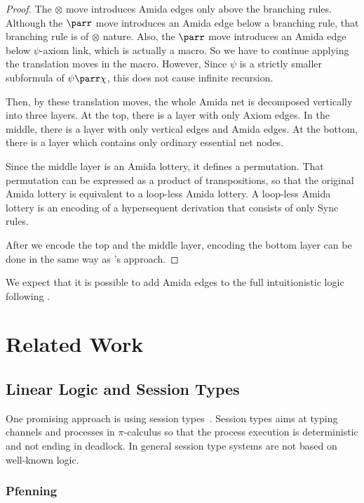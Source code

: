 \begin{proof}
The $\otimes$ move introduces Amida edges only above the branching rules.
Although the $\parr$ move introduces an Amida edge below a
branching rule, that branching rule is of $\otimes$ nature.
Also, the $\parr$ move introduces an Amida edge below $\psi$-axiom link,
which is actually a macro.  So we have to continue applying the
translation moves in the macro.  However, Since $\psi$ is a strictly
smaller subformula of $\psi\parr\chi$, this does not cause infinite
recursion.

Then, by these translation moves,
the whole Amida net is decomposed vertically into three layers.
At the top, there is a layer with only Axiom edges.
In the middle, there is a layer with only vertical edges and Amida
edges.
At the bottom, there is a layer which contains only ordinary
essential net nodes.

Since the middle layer is an Amida lottery, it defines a permutation.
That permutation can be expressed as a product of transpositions, so
that
the original Amida lottery is equivalent to a loop-less Amida lottery.
A loop-less Amida lottery is an encoding of a hypersequent derivation
that consists of only Sync rules.

After we encode the top and the middle layer, encoding the bottom layer
can be done in the same way as \citet{lamarche2008}'s approach.
 \end{proof}

We expect that it is possible to add Amida edges to
the full intuitionistic logic following
\citet{lamarche2008}.


\section{Related Work}

\subsection{Linear Logic and Session Types}

One promising approach is using session types~\citep{honda-session}.
Session types aims at typing channels and processes in $\pi$-calculus so
that the process execution is deterministic and not ending in deadlock.
In general session type systems are not based on well-known logic.



\subsubsection{Pfenning}

